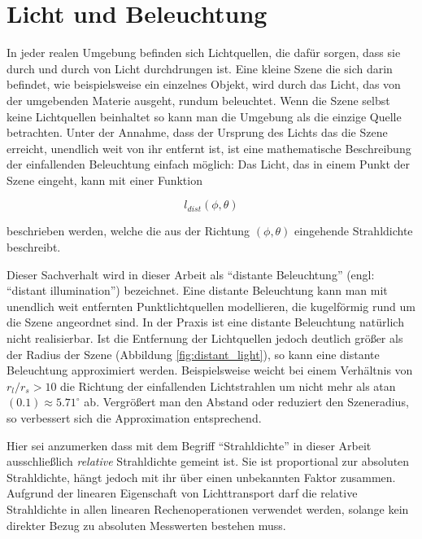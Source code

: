  \section{Licht und Beleuchtung} \label{light}
   
    In jeder realen Umgebung befinden sich Lichtquellen, die dafür sorgen, dass sie durch und durch von Licht durchdrungen ist.
    Eine kleine Szene die sich darin befindet, wie beispielsweise ein einzelnes Objekt, wird durch das Licht, das von der umgebenden Materie ausgeht, rundum beleuchtet.
    Wenn die Szene selbst keine Lichtquellen beinhaltet so kann man die Umgebung als die einzige Quelle betrachten.
    Unter der Annahme, dass der Ursprung des Lichts das die Szene erreicht, unendlich weit von ihr entfernt ist, ist eine mathematische Beschreibung der einfallenden Beleuchtung einfach möglich:
    Das Licht, das in einem Punkt der Szene eingeht, kann mit einer Funktion
    
   \begin{equation}
     l_{dist}(\phi, \theta)
    \label{eq:distant_light}
   \end{equation}
 
    beschrieben werden, welche die aus der Richtung $(\phi,\theta)$  eingehende Strahldichte beschreibt.

    Dieser Sachverhalt wird in dieser Arbeit als ``distante Beleuchtung''  (engl: ``distant illumination'') bezeichnet.
    Eine distante Beleuchtung kann man mit unendlich weit entfernten Punktlichtquellen modellieren, die kugelförmig rund um die Szene angeordnet sind.
    In der Praxis ist eine distante Beleuchtung natürlich nicht realisierbar.
    Ist die Entfernung der Lichtquellen jedoch deutlich größer als der Radius der Szene (Abbildung \ref{fig:distant_light}), so kann eine distante Beleuchtung approximiert werden. 
    Beispielsweise weicht bei einem Verhältnis von $ r_l / r_s > 10$ die Richtung der einfallenden Lichtstrahlen um nicht mehr als atan$(0.1) \approx 5.71^\circ$ ab. 
    Vergrößert man den Abstand oder reduziert den Szeneradius, so verbessert sich die Approximation entsprechend.

    Hier sei anzumerken dass mit dem Begriff ``Strahldichte'' in dieser Arbeit ausschließlich \emph{relative} Strahldichte gemeint ist.
    Sie ist proportional zur absoluten Strahldichte, hängt jedoch mit ihr über einen unbekannten Faktor zusammen.
    Aufgrund der linearen Eigenschaft von Lichttransport darf die relative Strahldichte in allen linearen Rechenoperationen verwendet werden, solange kein direkter Bezug zu absoluten Messwerten bestehen muss.
    

